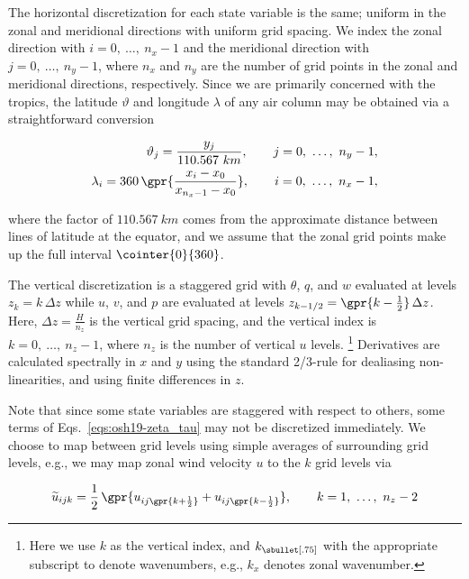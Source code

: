 The horizontal discretization for each state variable is the same; uniform in the zonal and meridional directions with uniform grid spacing. We index the zonal direction with $i = 0,\ \dots,\ n_x-1$ and the meridional direction with $j = 0,\ \dots,\ n_y - 1$, where $n_x$ and $n_y$ are the number of grid points in the zonal and meridional directions, respectively. Since we are primarily concerned with the tropics, the latitude $\vartheta$ and longitude $\lambda$ of any air column may be obtained via a straightforward conversion

\begin{subequations}
	\begin{align}
		\vartheta_j = \frac{y_j}{110.567\ km},\qquad j = 0,\ \dots,\ n_y - 1,\\
		\lambda_i = 360\,\gpr{\frac{x_i - x_0}{x_{{n_x} - 1} - x_0}},\qquad i = 0,\ \dots,\ n_x - 1,
	\end{align}
\end{subequations}

where the factor of $110.567\ km$ comes from the approximate distance between lines of latitude at the equator, and we assume that the zonal grid points make up the full interval $\cointer{0}{360}$.

The vertical discretization is a staggered grid with $\theta$, $q$, and $w$ evaluated at levels $z_k = k\,\Delta z$ while $u$, $v$, and $p$ are evaluated at levels $z_{k - 1/2} = \gpr{k - \frac{1}{2}}\,\Delta z$. Here, $\Delta z = \frac{H}{n_z}$ is the vertical grid spacing, and the vertical index is $k = 0,\ \dots,\ n_z - 1$, where $n_z$ is the number of vertical $u$ levels. \footnote{Here we use $k$ as the vertical index, and $k_{\sbullet[.75]}$ with the appropriate subscript to denote wavenumbers, e.g., $k_x$ denotes zonal wavenumber.} Derivatives are calculated spectrally in $x$ and $y$ using the standard 2/3-rule for dealiasing non-linearities, and using finite differences in $z$.

Note that since some state variables are staggered with respect to others, some terms of Eqs.~\ref{eqs:osh19-zeta_tau} may not be discretized immediately. We choose to map between grid levels using simple averages of surrounding grid levels, e.g., we may map zonal wind velocity $u$ to the $k$ grid levels via

\begin{equation}
	\widetilde{u}_{ijk} = \frac{1}{2}\,\gpr{u_{ij\gpr{k+\frac{1}{2}}} + u_{ij\gpr{k-\frac{1}{2}}}},\qquad k = 1,\ \dots,\ n_z - 2
\end{equation}

